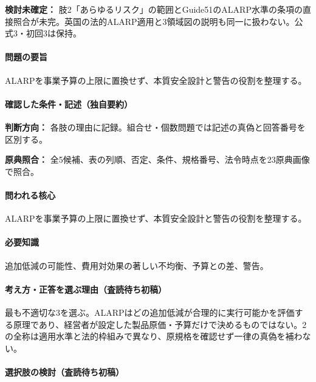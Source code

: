 \par\textbf{検討未確定：} 肢2「あらゆるリスク」の範囲とGuide51のALARP水準の条項の直接照合が未完。英国の法的ALARP適用と3領域図の説明も同一に扱わない。公式3・初回3は保持。

\paragraph{問題の要旨} ALARPを事業予算の上限に置換せず、本質安全設計と警告の役割を整理する。

\paragraph{確認した条件・記述（独自要約）}\mbox{}\par

\noindent\textbf{判断方向：} 各肢の理由に記録。組合せ・個数問題では記述の真偽と回答番号を区別する。\par

\noindent\textbf{原典照合：} 全5候補、表の列順、否定、条件、規格番号、法令時点を23原典画像で照合。\par

\paragraph{問われる核心} ALARPを事業予算の上限に置換せず、本質安全設計と警告の役割を整理する。

\paragraph{必要知識} 追加低減の可能性、費用対効果の著しい不均衡、予算との差、警告。

\paragraph{考え方・正答を選ぶ理由（査読待ち初稿）} 最も不適切な3を選ぶ。ALARPはどの追加低減が合理的に実行可能かを評価する原理であり、経営者が設定した製品原価・予算だけで決めるものではない。2の全称は適用水準と法的枠組みで異なり、原規格を確認せず一律の真偽を補わない。

\paragraph{選択肢の検討（査読待ち初稿）}\mbox{}\par


